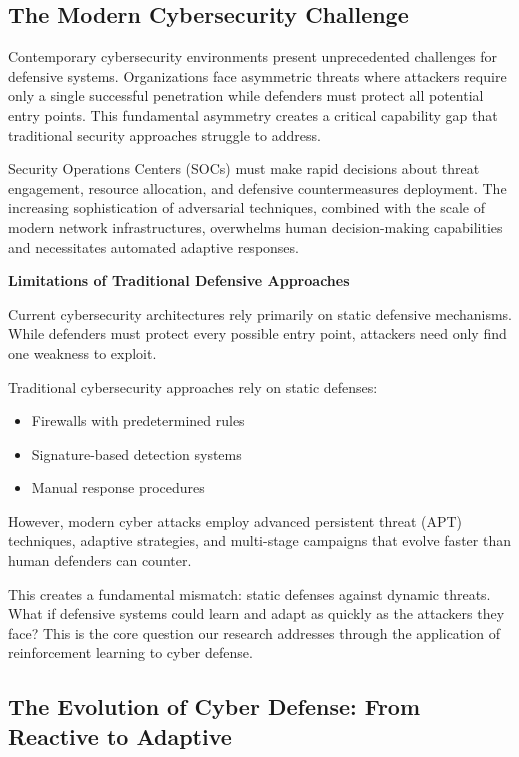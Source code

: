 \documentclass[12pt]{article}
\theoremstyle{definition}
\theoremstyle{plain}
\begin{document}
\subsection{The Modern Cybersecurity Challenge}

Contemporary cybersecurity environments present unprecedented challenges for defensive systems. Organizations face asymmetric threats where attackers require only a single successful penetration while defenders must protect all potential entry points. This fundamental asymmetry creates a critical capability gap that traditional security approaches struggle to address.

Security Operations Centers (SOCs) must make rapid decisions about threat engagement, resource allocation, and defensive countermeasures deployment. The increasing sophistication of adversarial techniques, combined with the scale of modern network infrastructures, overwhelms human decision-making capabilities and necessitates automated adaptive responses.

\textbf{Limitations of Traditional Defensive Approaches}

Current cybersecurity architectures rely primarily on static defensive mechanisms. While defenders must protect every possible entry point, attackers need only find one weakness to exploit. 

Traditional cybersecurity approaches rely on static defenses:
\begin{itemize}
    \item Firewalls with predetermined rules
    \item Signature-based detection systems  
    \item Manual response procedures
\end{itemize}

However, modern cyber attacks employ advanced persistent threat (APT) techniques, adaptive strategies, and multi-stage campaigns that evolve faster than human defenders can counter.

This creates a fundamental mismatch: static defenses against dynamic threats. What if defensive systems could learn and adapt as quickly as the attackers they face? This is the core question our research addresses through the application of reinforcement learning to cyber defense.

\subsection{The Evolution of Cyber Defense: From Reactive to Adaptive}
\end{document}
